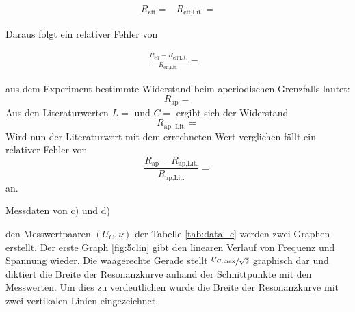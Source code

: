 \begin{align}
  &R_{\text{eff}}=\text{} 
  &R_{\text{eff,Lit.}}=\text{ }
\end{align}

Daraus folgt ein relativer Fehler von

\begin{align}
  \frac{R_{\text{eff}}-R_{\text{eff,Lit.}}}{R_{\text{eff,Lit.}}}= \text{ }
\end{align}


  \justifying aus dem Experiment bestimmte Widerstand beim aperiodischen Grenzfalls lautet:
  \begin{equation}
  R_{\text{ap}} = \text{} \label{eq:Rap}
  \end{equation}
  Aus den Literaturwerten $L = \text{}$ und $C =\text{}$ ergibt sich der Widerstand 
  \begin{equation}
  R_{\text{ap, Lit.}} = \text{} \label{eq:RapLit}
  \end{equation}
  Wird nun der Literaturwert mit dem errechneten Wert verglichen fällt ein relativer Fehler von
  \begin{equation}
  \frac{R_{\text{ap}} - R_{\text{ap,Lit.}}}{R_{\text{ap,Lit.}}} = \text{} \label{eq:RapAbw}
  \end{equation}
  an.


  \begin{table}[H]
        \centering
        \caption{Messdaten von c) und d)}
         
        \label{tab:data_c}
  \end{table}

  \justifying den Messwertpaaren $(U_C, \nu)$ der Tabelle \ref{tab:data_c} werden zwei Graphen erstellt. Der erste Graph \ref{fig:5clin} 
  gibt den linearen Verlauf von Frequenz und Spannung wieder. Die waagerechte Gerade stellt $\sfrac{U_{C,\text{max}}}{\sqrt{2}}$ graphisch dar und diktiert
  die Breite der Resonanzkurve anhand der Schnittpunkte mit den Messwerten. Um dies zu verdeutlichen wurde die Breite der Resonanzkurve mit zwei vertikalen 
  Linien eingezeichnet. 


